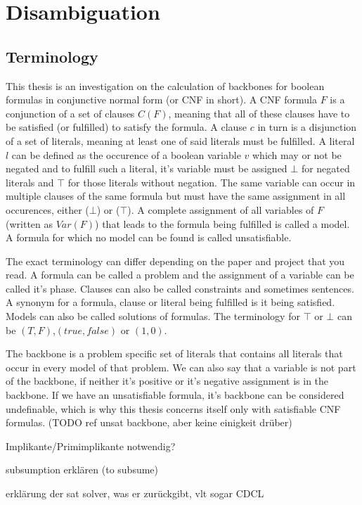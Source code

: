 \section{Disambiguation}
\subsection{Terminology}
This thesis is an investigation on the calculation of backbones for boolean formulas in conjunctive normal form (or CNF in short). A CNF formula $F$ is a conjunction of a set of clauses $C(F)$, meaning that all of these clauses have to be satisfied (or fulfilled) to satisfy the formula. A clause $c$ in turn is a disjunction of a set of literals, meaning at least one of said literals must be fulfilled. A literal $l$ can be defined as the occurence of a boolean variable $v$ which may or not be negated and to fulfill such a literal, it's variable must be assigned $\bot$ for negated literals and $\top$ for those literals without negation. The same variable can occur in multiple clauses of the same formula but must have the same assignment in all occurences, either ($\bot$) or ($\top$). A complete assignment of all variables of $F$ (written as $Var(F)$) that leads to the formula being fulfilled is called a model. A formula for which no model can be found is called unsatisfiable.



The exact terminology can differ depending on the paper and project that you read. A formula can be called a problem and the assignment of a variable can be called it's phase. Clauses can also be called constraints and sometimes sentences. A synonym for a formula, clause or literal being fulfilled is it being satisfied. Models can also be called solutions of formulas. The terminology for $\top$ or $\bot$ can be $(T,F)$,$(true,false)$ or $(1,0)$.



The backbone is a problem specific set of literals that contains all literals that occur in every model of that problem. We can also say that a variable is not part of the backbone, if neither it's positive or it's negative assignment is in the backbone. If we have an unsatisfiable formula, it's backbone can be considered undefinable, which is why this thesis concerns itself only with satisfiable CNF formulas. (TODO ref unsat backbone, aber keine einigkeit drüber)

Implikante/Primimplikante notwendig?

subsumption erklären (to subsume)

erklärung der sat solver, was er zurückgibt, vlt sogar CDCL